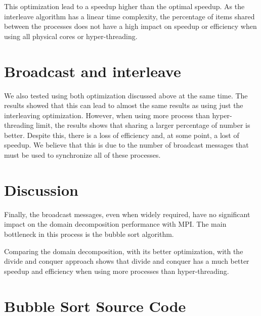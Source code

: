 \documentclass[10pt,twocolumn]{article}
\begin{document}
This optimization lead to a speedup higher than the optimal speedup. As the interleave algorithm has a linear time complexity, the percentage of items shared between the processes does not have a high impact on speedup or efficiency when using all physical cores or hyper-threading.


\section*{Broadcast and interleave}

We also tested using both optimization discussed above at the same time. The results showed that this can lead to almost the same results as using just the interleaving optimization. However, when using more process than hyper-threading limit, the results shows that sharing a larger percentage of number is better. Despite this, there is a loss of efficiency and, at some point, a lost of speedup. We believe that this is due to the number of broadcast messages that must be used to synchronize all of these processes.


\section*{Discussion}

Finally, the broadcast messages, even when widely required, have no significant impact on the domain decomposition performance with MPI. The main bottleneck in this process is the bubble sort algorithm.

Comparing the domain decomposition, with its better optimization, with the divide and conquer approach shows that divide and conquer has a much better speedup and efficiency when using more processes than hyper-threading.


\onecolumn

\section*{Bubble Sort Source Code}




\end{document}
